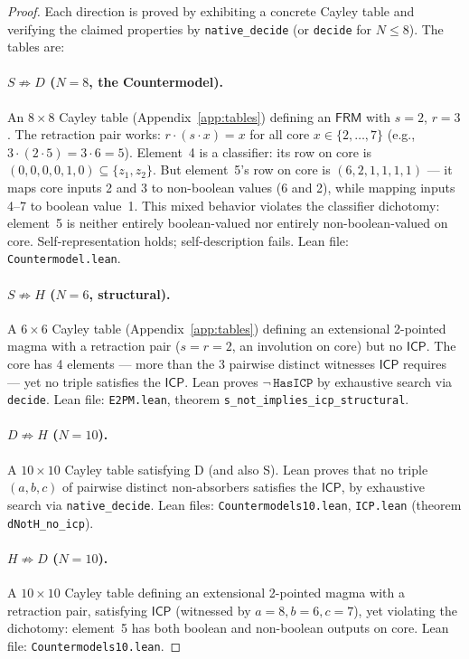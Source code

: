 \documentclass[sigconf,screen,review,anonymous]{acmart}
\newcommand{\dotop}{\cdot}
\newcommand{\FRM}{\textsf{FRM}}
\newcommand{\ICP}{\textsf{ICP}}
\begin{document}
\begin{proof}
Each direction is proved by exhibiting a concrete Cayley table and verifying the claimed properties by \texttt{native\_decide} (or \texttt{decide} for $N \leq 8$). The tables are:

\paragraph{$S \not\Rightarrow D$ ($N\!=\!8$, the Countermodel).}
An $8 \times 8$ Cayley table (Appendix~\ref{app:tables}) defining an $\FRM$ with $s = 2$, $r = 3$. The retraction pair works: $r \dotop (s \dotop x) = x$ for all core $x \in \{2,\ldots,7\}$ (e.g., $3 \dotop (2 \dotop 5) = 3 \dotop 6 = 5$). Element~4 is a classifier: its row on core is $(0,0,0,0,1,0) \subseteq \{z_1, z_2\}$. But element~5's row on core is $(6, 2, 1, 1, 1, 1)$ — it maps core inputs 2 and 3 to non-boolean values (6 and 2), while mapping inputs 4--7 to boolean value~1. This mixed behavior violates the classifier dichotomy: element~5 is neither entirely boolean-valued nor entirely non-boolean-valued on core. Self-representation holds; self-description fails. Lean file: \texttt{Countermodel.lean}.

\paragraph{$S \not\Rightarrow H$ ($N\!=\!6$, structural).}
A $6 \times 6$ Cayley table (Appendix~\ref{app:tables}) defining an extensional 2-pointed magma with a retraction pair ($s = r = 2$, an involution on core) but no $\ICP$. The core has 4 elements — more than the 3 pairwise distinct witnesses $\ICP$ requires — yet no triple satisfies the $\ICP$. Lean proves $\neg\,\texttt{HasICP}$ by exhaustive search via \texttt{decide}. Lean file: \texttt{E2PM.lean}, theorem \texttt{s\_not\_implies\_icp\_structural}.

\paragraph{$D \not\Rightarrow H$ ($N\!=\!10$).}
A $10 \times 10$ Cayley table satisfying D (and also S). Lean proves that no triple $(a, b, c)$ of pairwise distinct non-absorbers satisfies the $\ICP$, by exhaustive search via \texttt{native\_decide}. Lean files: \texttt{Countermodels10.lean}, \texttt{ICP.lean} (theorem \texttt{dNotH\_no\_icp}).

\paragraph{$H \not\Rightarrow D$ ($N\!=\!10$).}
A $10 \times 10$ Cayley table defining an extensional 2-pointed magma with a retraction pair, satisfying $\ICP$ (witnessed by $a\!=\!8, b\!=\!6, c\!=\!7$), yet violating the dichotomy: element~5 has both boolean and non-boolean outputs on core. Lean file: \texttt{Countermodels10.lean}.


\end{proof}
\end{document}
